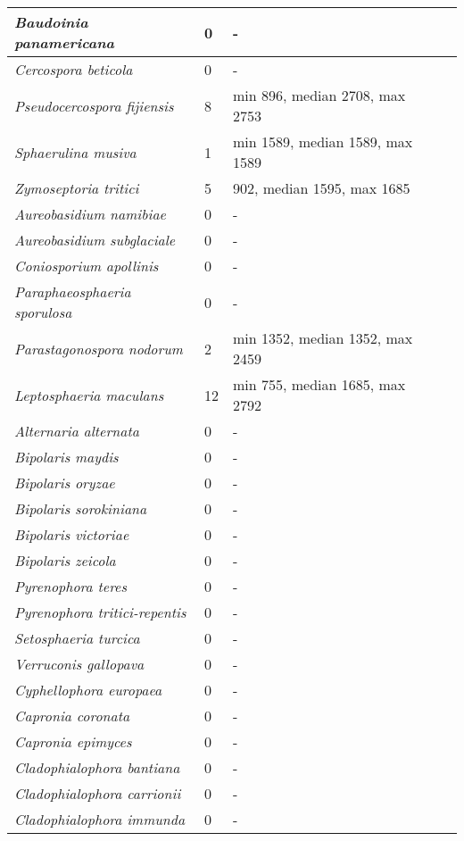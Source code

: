 {\begin{longtable}{| L{4cm} | L{2cm}  | L{5cm} | L{4cm} |}
\textit{Baudoinia panamericana} & 0 & - & \\ \hline
\textit{Cercospora beticola} & 0 & - & \\ \hline
\textit{Pseudocercospora fijiensis} & 8 & min 896, median 2708, max 2753 & \\ \hline
\textit{Sphaerulina musiva} & 1 & min 1589, median 1589, max 1589 & \\ \hline
\textit{Zymoseptoria tritici} & 5 & 902, median 1595, max 1685 & \\ \hline
\textit{Aureobasidium namibiae} & 0 & - & \\ \hline
\textit{Aureobasidium subglaciale} & 0 & - & \\ \hline
\textit{Coniosporium apollinis} & 0 & - & \\ \hline
\textit{Paraphaeosphaeria sporulosa} & 0 & - & \\ \hline
\textit{Parastagonospora nodorum} & 2 & min 1352, median 1352, max 2459 & \\ \hline
\textit{Leptosphaeria maculans} & 12 & min 755, median 1685, max 2792 & \\ \hline
\textit{Alternaria alternata} & 0 & - & \\ \hline
\textit{Bipolaris maydis} & 0 & - & \\ \hline
\textit{Bipolaris oryzae} & 0 & - & \\ \hline
\textit{Bipolaris sorokiniana} & 0 & - & \\ \hline
\textit{Bipolaris victoriae} & 0 & - & \\ \hline
\textit{Bipolaris zeicola} & 0 & - & \\ \hline
\textit{Pyrenophora teres} & 0 & - & \\ \hline
\textit{Pyrenophora tritici-repentis} & 0 & - & \\ \hline
\textit{Setosphaeria turcica} & 0 & - & \\ \hline
\textit{Verruconis gallopava} & 0 & - & \\ \hline
\textit{Cyphellophora europaea} & 0 & - & \\ \hline
\textit{Capronia coronata} & 0 & - & \\ \hline
\textit{Capronia epimyces} & 0 & - & \\ \hline
\textit{Cladophialophora bantiana} & 0 & - & \\ \hline
\textit{Cladophialophora carrionii} & 0 & - & \\ \hline
\textit{Cladophialophora immunda} & 0 & - & \\ \hline

\end{longtable}}
